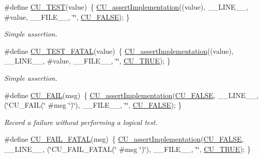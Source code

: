\begin{DoxyCompactItemize}
\#define \hyperlink{group___framework_ga1b3da8721edd6a08963dcf471b34b81b}{C\+U\+\_\+\+T\+E\+S\+T}(value)~\{ \hyperlink{group___framework_gad409fc536d9d3fb5f659c76421e8ce3b}{C\+U\+\_\+assert\+Implementation}((value), \+\_\+\+\_\+\+L\+I\+N\+E\+\_\+\+\_\+, \#value, \+\_\+\+\_\+\+F\+I\+L\+E\+\_\+\+\_\+, \char`\"{}\char`\"{}, \hyperlink{group___framework_ga7453214541b156ef868681eaafe60860}{C\+U\+\_\+\+F\+A\+L\+S\+E}); \}
\begin{DoxyCompactList}\small\item\em Simple assertion. \end{DoxyCompactList}\item 
\#define \hyperlink{group___framework_ga0a2e279af06a9cd72e5b0faab7b3bbaf}{C\+U\+\_\+\+T\+E\+S\+T\+\_\+\+F\+A\+T\+A\+L}(value)~\{ \hyperlink{group___framework_gad409fc536d9d3fb5f659c76421e8ce3b}{C\+U\+\_\+assert\+Implementation}((value), \+\_\+\+\_\+\+L\+I\+N\+E\+\_\+\+\_\+, \#value, \+\_\+\+\_\+\+F\+I\+L\+E\+\_\+\+\_\+, \char`\"{}\char`\"{}, \hyperlink{group___framework_ga99641394bc766ca9c4a295e942fed1ef}{C\+U\+\_\+\+T\+R\+U\+E}); \}
\begin{DoxyCompactList}\small\item\em Simple assertion. \end{DoxyCompactList}\item 
\#define \hyperlink{group___framework_gabe35d38d86cb4472319bd83c3e2ab60b}{C\+U\+\_\+\+F\+A\+I\+L}(msg)~\{ \hyperlink{group___framework_gad409fc536d9d3fb5f659c76421e8ce3b}{C\+U\+\_\+assert\+Implementation}(\hyperlink{group___framework_ga7453214541b156ef868681eaafe60860}{C\+U\+\_\+\+F\+A\+L\+S\+E}, \+\_\+\+\_\+\+L\+I\+N\+E\+\_\+\+\_\+, (\char`\"{}C\+U\+\_\+\+F\+A\+I\+L(\char`\"{} \#msg \char`\"{})\char`\"{}), \+\_\+\+\_\+\+F\+I\+L\+E\+\_\+\+\_\+, \char`\"{}\char`\"{}, \hyperlink{group___framework_ga7453214541b156ef868681eaafe60860}{C\+U\+\_\+\+F\+A\+L\+S\+E}); \}
\begin{DoxyCompactList}\small\item\em Record a failure without performing a logical test. \end{DoxyCompactList}\item 
\#define \hyperlink{group___framework_gaa318f5cbedfa0e23781eb69ef82b86de}{C\+U\+\_\+\+F\+A\+I\+L\+\_\+\+F\+A\+T\+A\+L}(msg)~\{ \hyperlink{group___framework_gad409fc536d9d3fb5f659c76421e8ce3b}{C\+U\+\_\+assert\+Implementation}(\hyperlink{group___framework_ga7453214541b156ef868681eaafe60860}{C\+U\+\_\+\+F\+A\+L\+S\+E}, \+\_\+\+\_\+\+L\+I\+N\+E\+\_\+\+\_\+, (\char`\"{}C\+U\+\_\+\+F\+A\+I\+L\+\_\+\+F\+A\+T\+A\+L(\char`\"{} \#msg \char`\"{})\char`\"{}), \+\_\+\+\_\+\+F\+I\+L\+E\+\_\+\+\_\+, \char`\"{}\char`\"{}, \hyperlink{group___framework_ga99641394bc766ca9c4a295e942fed1ef}{C\+U\+\_\+\+T\+R\+U\+E}); \}

\end{DoxyCompactItemize}
